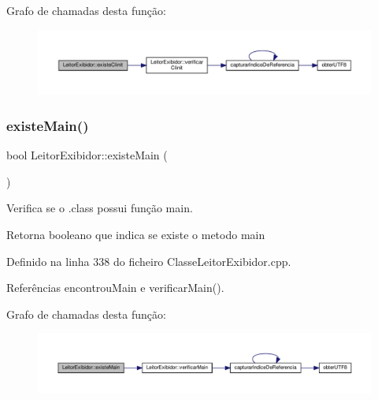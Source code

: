 Grafo de chamadas desta função\+:
\nopagebreak
\begin{figure}[H]
\begin{center}
\leavevmode
\includegraphics[width=350pt]{classLeitorExibidor_a5a3ef889b1e38506d9d0df17255cad4e_cgraph}
\end{center}
\end{figure}
\mbox{\label{classLeitorExibidor_a431c625c01124f40e7b6f6fab2bdb7f2}} 
\subsubsection{\texorpdfstring{existe\+Main()}{existeMain()}}
{\footnotesize\ttfamily bool Leitor\+Exibidor\+::existe\+Main (\begin{DoxyParamCaption}{ }\end{DoxyParamCaption})}



Verifica se o .class possui função main. 

\begin{DoxyReturn}{Retorna}
booleano que indica se existe o metodo main 
\end{DoxyReturn}


Definido na linha 338 do ficheiro Classe\+Leitor\+Exibidor.\+cpp.



Referências encontrou\+Main e verificar\+Main().

Grafo de chamadas desta função\+:
\nopagebreak
\begin{figure}[H]
\begin{center}
\leavevmode
\includegraphics[width=350pt]{classLeitorExibidor_a431c625c01124f40e7b6f6fab2bdb7f2_cgraph}
\end{center}
\end{figure}
\mbox{\label{classLeitorExibidor_a16868d53a83dca37586819aadeb7f0eb}} 
